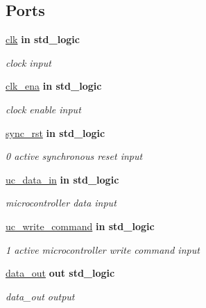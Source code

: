 \subsection*{Ports}
 \begin{DoxyCompactItemize}
\item 
\hyperlink{classflip__flop___r_w___r_a4a4609c199d30b3adebbeb3a01276ec5}{clk}  {\bfseries {\bfseries \textcolor{vhdlchar}{in}\textcolor{vhdlchar}{ }}} {\bfseries \textcolor{vhdlchar}{std\+\_\+logic}\textcolor{vhdlchar}{ }} 
\begin{DoxyCompactList}\small\item\em clock input \end{DoxyCompactList}\item 
\hyperlink{classflip__flop___r_w___r_a373faa4fdd1aebdfb0b95d5d53da4434}{clk\+\_\+ena}  {\bfseries {\bfseries \textcolor{vhdlchar}{in}\textcolor{vhdlchar}{ }}} {\bfseries \textcolor{vhdlchar}{std\+\_\+logic}\textcolor{vhdlchar}{ }} 
\begin{DoxyCompactList}\small\item\em clock enable input \end{DoxyCompactList}\item 
\hyperlink{classflip__flop___r_w___r_acb5ff599d2768c125faacfd9361063eb}{sync\+\_\+rst}  {\bfseries {\bfseries \textcolor{vhdlchar}{in}\textcolor{vhdlchar}{ }}} {\bfseries \textcolor{vhdlchar}{std\+\_\+logic}\textcolor{vhdlchar}{ }} 
\begin{DoxyCompactList}\small\item\em \textquotesingle{}0\textquotesingle{} active synchronous reset input \end{DoxyCompactList}\item 
\hyperlink{classflip__flop___r_w___r_aeb86d5268b7f0b59c74427f44096ffd5}{uc\+\_\+data\+\_\+in}  {\bfseries {\bfseries \textcolor{vhdlchar}{in}\textcolor{vhdlchar}{ }}} {\bfseries \textcolor{vhdlchar}{std\+\_\+logic}\textcolor{vhdlchar}{ }} 
\begin{DoxyCompactList}\small\item\em microcontroller data input \end{DoxyCompactList}\item 
\hyperlink{classflip__flop___r_w___r_adec7180b72b510c9b6576424bd7fde7e}{uc\+\_\+write\+\_\+command}  {\bfseries {\bfseries \textcolor{vhdlchar}{in}\textcolor{vhdlchar}{ }}} {\bfseries \textcolor{vhdlchar}{std\+\_\+logic}\textcolor{vhdlchar}{ }} 
\begin{DoxyCompactList}\small\item\em \textquotesingle{}1\textquotesingle{} active microcontroller write command input \end{DoxyCompactList}\item 
\hyperlink{classflip__flop___r_w___r_a8d76ddf4f2f1e1e6689a8d706fe52c10}{data\+\_\+out}  {\bfseries {\bfseries \textcolor{vhdlchar}{out}\textcolor{vhdlchar}{ }}} {\bfseries \textcolor{vhdlchar}{std\+\_\+logic}\textcolor{vhdlchar}{ }} 
\begin{DoxyCompactList}\small\item\em data\+\_\+out output \end{DoxyCompactList}\end{DoxyCompactItemize}


